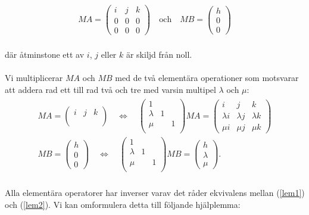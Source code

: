 \documentclass{article}
\begin{document}
\begin{gather}
  MA =
  \begin{pmatrix}
    i & j & k \\
    0 & 0 & 0 \\
    0 & 0 & 0
  \end{pmatrix}
  \quad \text{och} \quad
  MB =
  \begin{pmatrix}
    h \\ 0 \\ 0
  \end{pmatrix} \label{lem1}
\end{gather}
\\
där åtminstone ett av $i$, $j$ eller $k$ är skiljd från noll.
\\
\\
Vi multiplicerar $MA$ och $MB$ med de två elementära operationer som motsvarar att addera rad ett till rad två och tre med varsin multipel $\lambda$ och $\mu$:
\\
\begin{gather}
\begin{split}
  MA =
  \begin{pmatrix}
    i & j & k \\
    && \\
    &&
  \end{pmatrix}
  \quad \iff \quad
  \begin{pmatrix}
    1 &&\\
    \lambda &1&\\
    \mu&&1\\
  \end{pmatrix}
  MA =
  \begin{pmatrix}
    i & j & k \\
    \lambda i & \lambda j & \lambda k \\
    \mu i & \mu j & \mu k
  \end{pmatrix}\\[10pt]
  MB =
  \begin{pmatrix}
    h \\ 0 \\ 0
  \end{pmatrix}
  \quad \iff \quad
  \begin{pmatrix}
    1 &&\\
    \lambda &1&\\
    \mu&&1\\
  \end{pmatrix}
  MB =
  \begin{pmatrix}
    h \\ \lambda \\ \mu
  \end{pmatrix}\text{.}
\end{split}\label{lem2}
\end{gather}
\\
Alla elementära operatorer har inverser varav det råder ekvivalens mellan (\ref{lem1}) och (\ref{lem2}). Vi kan omformulera detta till följande hjälplemma:
\end{document}
